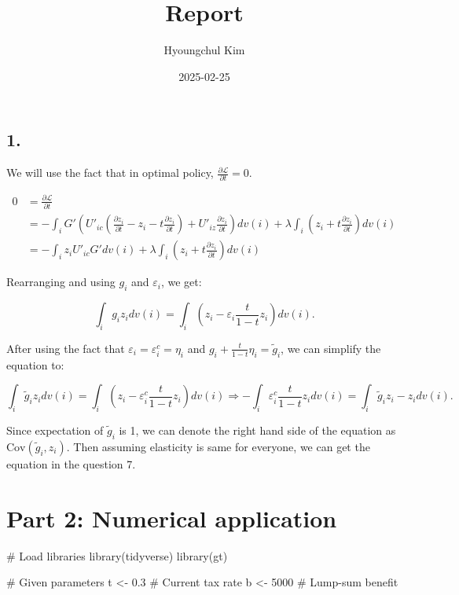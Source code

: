 \documentclass[
  letterpaper,
  DIV=11,
  numbers=noendperiod]{scrartcl}
\title{Report}
\author{Hyoungchul Kim}
\date{2025-02-25}
\newenvironment{Shaded}{\begin{snugshade}}{\end{snugshade}}
\newcommand{\CommentTok}[1]{\textcolor[rgb]{0.37,0.37,0.37}{#1}}
\newcommand{\DecValTok}[1]{\textcolor[rgb]{0.68,0.00,0.00}{#1}}
\newcommand{\FloatTok}[1]{\textcolor[rgb]{0.68,0.00,0.00}{#1}}
\newcommand{\FunctionTok}[1]{\textcolor[rgb]{0.28,0.35,0.67}{#1}}
\newcommand{\NormalTok}[1]{\textcolor[rgb]{0.00,0.23,0.31}{#1}}
\newcommand{\OtherTok}[1]{\textcolor[rgb]{0.00,0.23,0.31}{#1}}
\begin{document}
\maketitle


\subsection{1.}\label{section}

We will use the fact that in optimal policy,
\(\frac{\partial \mathcal{L}}{\partial t} = 0\).

\begin{align}
  0 &= \frac{\partial \mathcal{L}}{\partial t}\\
    &= - \int_i G' \left( U'_{ic} \left( \frac{\partial z_i}{\partial t} - z_i - t \frac{\partial z_i}{\partial t}\right) + U'_{iz} \frac{\partial z_i}{\partial t} \right)dv(i) + \lambda \int_i \left( z_i + t \frac{\partial z_i}{\partial t} \right)dv(i)\\
    &= - \int_i z_i U'_{ic} G' dv(i) + \lambda \int_i \left( z_i + t \frac{\partial z_i}{\partial t} \right)dv(i)
\end{align}

Rearranging and using \(g_i\) and \(\varepsilon_i\), we get:

\[
\int_i g_i z_i dv(i) = \int_i \left( z_i - \varepsilon_i \frac{t}{1-t} z_i \right)dv(i).
\]

After using the fact that \(\varepsilon_i = \varepsilon^c_i = \eta_i\)
and \(g_i + \frac{t}{1-t} \eta_i = \tilde{g}_i\), we can simplify the
equation to:

\[
  \int_i \tilde{g}_i z_i dv(i) = \int_i \left( z_i - \varepsilon^c_i \frac{t}{1-t} z_i \right)dv(i) \Rightarrow - \int_i \varepsilon^c_i \frac{t}{1-t}z_i dv(i) = \int_i \tilde{g}_i z_i - z_i dv(i).
\]

Since expectation of \(\tilde{g}_i\) is 1, we can denote the right hand
side of the equation as \(\text{Cov} (\tilde{g}_i, z_i)\). Then assuming
elasticity is same for everyone, we can get the equation in the question
7.

\section{Part 2: Numerical
application}\label{part-2-numerical-application}

\begin{Shaded}
\begin{Highlighting}[]
\CommentTok{\# Load libraries}
\FunctionTok{library}\NormalTok{(tidyverse)}
\FunctionTok{library}\NormalTok{(gt)}

\CommentTok{\# Given parameters}
\NormalTok{t }\OtherTok{\textless{}{-}} \FloatTok{0.3}  \CommentTok{\# Current tax rate}
\NormalTok{b }\OtherTok{\textless{}{-}} \DecValTok{5000} \CommentTok{\# Lump{-}sum benefit}
\end{Highlighting}
\end{Shaded}
\end{document}
